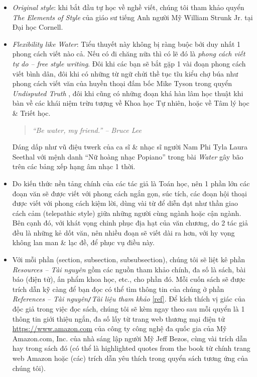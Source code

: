 \documentclass[12pt]{article}
\begin{document}
\begin{itemize}
	\item {\it Original style}: khi bắt đầu tự học về nghề viết, chúng tôi tham khảo quyển {\it The Elements of Style} \cite{Strunk1918,Strunk_White2019} của giáo sư tiếng Anh người Mỹ {\sc William Strunk Jr.} tại Đại học Cornell.
	\item {\it Flexibility like Water}: Tiểu thuyết này không bị ràng buộc bởi duy nhất 1 phong cách viết nào cả. Nếu có đi chăng nữa thì có lẽ đó là {\it phong cách viết tự do -- free style writing}. Đôi khi các bạn sẽ bắt gặp 1 vài đoạn phong cách viết bình dân, đôi khi có những từ ngữ chửi thề tục tĩu kiểu chợ búa như phong cách viết văn của huyền thoại đấm bốc {\sc Mike Tyson} trong quyển {\it Undisputed Truth} \cite{Tyson_Sloman2013}, đôi khi cũng có những đoạn khá hàn lâm học thuật khi bàn về các khái niệm trừu tượng về Khoa học Tự nhiên, hoặc về Tâm lý học \& Triết học.
	\begin{quotation}\it
		``Be water, my friend.'' -- {\sc Bruce Lee}
	\end{quotation}
	Dáng dấp như vũ điệu twerk của ca sĩ \& nhạc sĩ người Nam Phi {\sc Tyla Laura Seethal} với mệnh danh ``Nữ hoàng nhạc Popiano'' trong bài {\it Water} gây bão trên các bảng xếp hạng âm nhạc 1 thời.
	\item Do kiến thức nền tảng chính của các tác giả là Toán học, nên 1 phần lớn các đoạn văn sẽ được viết với phong cách ngắn gọn, súc tích, các đoạn hội thoại được viết với phong cách kiệm lời, dùng vài từ để diễn đạt như thần giao cách cảm (telepathic style) giữa những người cùng ngành hoặc cận ngành. Bên cạnh đó, với khát vọng chinh phục địa hạt của văn chương, do 2 tác giả đều là những kẻ dốt văn, nên nhiều đoạn sẽ viết dài ra hơn, với hy vọng không lan man \& lạc đề, để phục vụ điều này.
	\item Với mỗi phần (section, subsection, subsubsection), chúng tôi sẽ liệt kê phần {\it Resources -- Tài nguyên} gồm các nguồn tham khảo chính, đa số là sách, bài báo (điện tử), ấn phẩm khoa học, etc., cho phần đó. Mỗi cuốn sách sẽ được trích dẫn kỹ càng để bạn đọc có thể tìm thông tin của chúng ở phần {\it References -- Tài nguyên{\tt/}Tài liệu tham khảo} \ref{ref}. Để kích thích vị giác của độc giả trong việc đọc sách, chúng tôi sẽ kèm ngay theo sau mỗi quyển là 1 thông tin giới thiệu ngắn, đa số lấy từ trang web thương mại điện tử \url{https://www.amazon.com} của công ty công nghệ đa quốc gia của Mỹ {\sf Amazon.com, Inc.} của nhà sáng lập người Mỹ {\sc Jeff Bezos}, cùng vài trích dẫn hay trong sách đó (có thể là highlighted quotes from the book từ chính trang web Amazon hoặc (các) trích dẫn yêu thích trong quyển sách tương ứng của chúng tôi).
\end{itemize}
\end{document}
